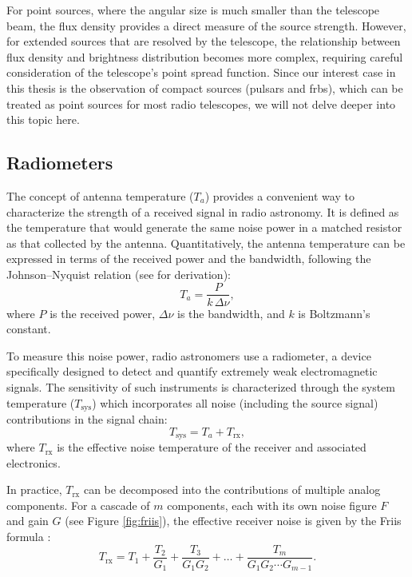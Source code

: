 For point sources, where the angular size is much smaller than the telescope beam, the flux density provides a direct measure of the source strength. However, for extended sources that are resolved by the telescope, the relationship between flux density and brightness distribution becomes more complex, requiring careful consideration of the telescope's point spread function. Since our interest case in this thesis is the observation of compact sources (pulsars and \glspl{frb}), which can be treated as point sources for most radio telescopes, we will not delve deeper into this topic here. 

\subsection{Radiometers}
The concept of antenna temperature ($T_a$) provides a convenient way to characterize the strength of a received signal in radio astronomy. It is defined as the temperature that would generate the same noise power in a matched resistor as that collected by the antenna. Quantitatively, the antenna temperature can be expressed in terms of the received power and the bandwidth, following the Johnson–Nyquist relation (see \citealt{Nyquits_noise} for derivation):
\begin{equation}
    T_a = \frac{P}{k \, \Delta \nu},
	\label{eq:thermal_noise_power}
\end{equation}
where $P$ is the received power, $\Delta \nu$ is the bandwidth, and $k$ is Boltzmann’s constant. 

To measure this noise power, radio astronomers use a radiometer, a device specifically designed to detect and quantify extremely weak electromagnetic signals. The sensitivity of such instruments is characterized through the system temperature ($T_\text{sys}$) which incorporates all noise (including the source signal) contributions in the signal chain:  
\begin{equation}
    T_\text{sys} = T_a + T_{\text{rx}},
\end{equation}
where $T_{\text{rx}}$ is the effective noise temperature of the receiver and associated electronics.  

In practice, $T_{\text{rx}}$ can be decomposed into the contributions of multiple analog components. For a cascade of $m$ components, each with its own noise figure $F$ and gain $G$ (see Figure \ref{fig:friis}), the effective receiver noise is given by the Friis formula \citep{Friis1944}:  
\begin{equation}
    T_{\text{rx}} = T_1 + \frac{T_2}{G_1} + \frac{T_3}{G_1 G_2} + \dots + \frac{T_{m}}{G_1 G_2 \cdots G_{m-1}}.
	\label{eq:friis}
\end{equation}

